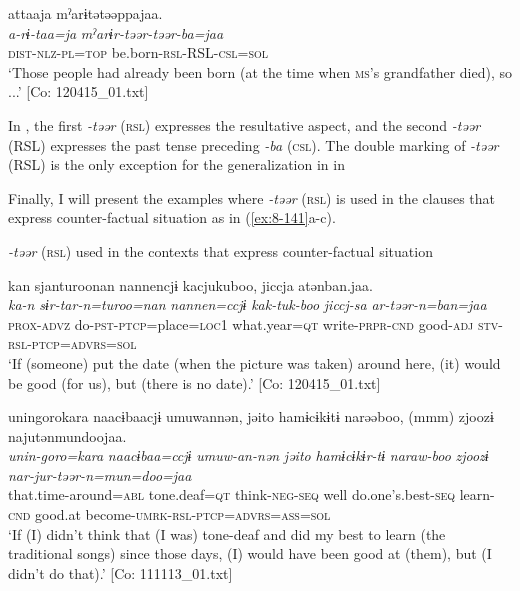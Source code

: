   {\TM}
\glll  attaaja  mˀarɨtətəəppajaa.\\
\textit{a-rɨ-taa=ja}  \textit{mˀarɨr-təər-təər-ba=jaa}\\
    \textsc{dist}-\textsc{nlz}-\textsc{pl}=\textsc{top}  be.born-\textsc{rsl}-RSL-\textsc{csl}=\textsc{sol}\\
\glt ‘Those people had already been born (at the time when \textsc{ms}’s grandfather died), so ...’ [Co: 120415\_01.txt]
\z

In , the first \textit{-təər} (\textsc{rsl}) expresses the resultative aspect, and the second \textit{-təər} (RSL) expresses the past tense preceding \textit{-ba} (\textsc{csl}). The double marking of \textit{-təər} (RSL) is the only exception for the generalization in  in 

  Finally, I will present the examples where \textit{-təər} (\textsc{rsl}) is used in the clauses that express counter-factual situation as in (\ref{ex:8-141}a-c).

\ea\label{ex:8-141}
  \textit{-təər} (\textsc{rsl}) used in the contexts that express counter-factual situation

\ea
{\TM}
\glll  kan  sjanturoonan  {\textbar}nannen{\textbar}cjɨ  kacjukuboo,      jiccja  atənban.jaa.  \\
\textit{ka-n}  \textit{sɨr-tar-n=turoo=nan}  \textit{nannen=ccjɨ}  \textit{kak-tuk-boo}      \textit{jiccj-sa}  \textit{ar-təər-n=ban=jaa}\\
\textsc{prox}-\textsc{advz}  do-\textsc{pst}-\textsc{ptcp}=place=\textsc{loc}1  what.year=\textsc{qt}  write-\textsc{prpr}-\textsc{cnd}  good-\textsc{adj}  \textsc{stv}-\textsc{rsl}-\textsc{ptcp}=\textsc{advrs}=\textsc{sol}\\
\glt ‘If (someone) put the date (when the picture was taken) around here, (it) would be good (for us), but (there is no date).’ [Co: 120415\_01.txt]

\ex
{\TM}
\glll  unin{\textbar}goro{\textbar}kara  naacɨbaacjɨ  umuwannən,  jəito  hamɨcɨkɨtɨ      narəəboo,  (mmm)  zjoozɨ  najutənmundoojaa.\\
\textit{unin-goro=kara}  \textit{naacɨbaa=ccjɨ}  \textit{umuw-an-nən}  \textit{jəito}  \textit{hamɨcɨkɨr-tɨ}      \textit{naraw-boo}    \textit{zjoozɨ}  \textit{nar-jur-təər-n=mun=doo=jaa}\\
that.time-around=\textsc{abl}  tone.deaf=\textsc{qt}  think-\textsc{neg}-\textsc{seq}  well  do.one’s.best-\textsc{seq}  learn-\textsc{cnd}    good.at  become-\textsc{umrk}-\textsc{rsl}-\textsc{ptcp}=\textsc{advrs}=\textsc{ass}=\textsc{sol}\\
\glt ‘If (I) didn’t think that (I was) tone-deaf and did my best to learn (the traditional songs) since those days, (I) would have been good at (them), but (I didn’t do that).’ [Co: 111113\_01.txt]

